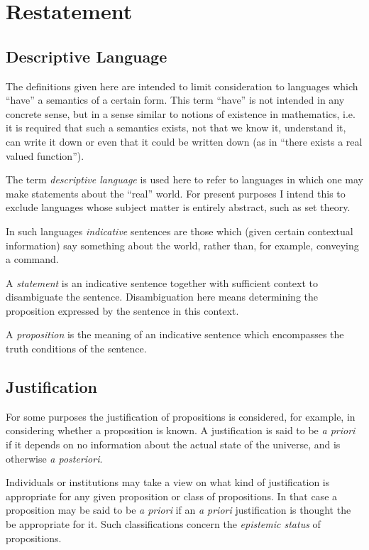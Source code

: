 \section{Restatement}\label{Restatement}

\subsection{Descriptive Language}

The definitions given here are intended to limit consideration to languages which ``have'' a semantics of a certain form.
This term ``have'' is not intended in any concrete sense, but in a sense similar to notions of existence in mathematics, i.e. it is required that such a semantics exists, not that we know it, understand it, can write it down or even that it could be written down (as in ``there exists a real valued function'').

The term {\it descriptive language} is used here to refer to languages in which one may make statements about the ``real'' world.
For present purposes I intend this to exclude languages whose subject matter is entirely abstract, such as set theory.

In such languages {\it indicative} sentences are those which (given certain contextual information) say something about the world, rather than, for example, conveying a command.

A {\it statement} is an indicative sentence together with sufficient context to disambiguate the sentence.
Disambiguation here means determining the proposition expressed by the sentence in this context.

A {\it proposition} is the meaning of an indicative sentence which encompasses the truth conditions of the sentence.

\subsection{Justification}

For some purposes the justification of propositions is considered, for example, in considering whether a proposition is known.
A justification is said to be {\it a priori} if it depends on no information about the actual state of the universe, and is otherwise {\it a posteriori}.

Individuals or institutions may take a view on what kind of justification is appropriate for any given proposition or class of propositions.
In that case a proposition may be said to be {\it a priori} if an {\it a priori} justification is thought the be appropriate for it.
Such classifications concern the {\it epistemic status} of propositions.

